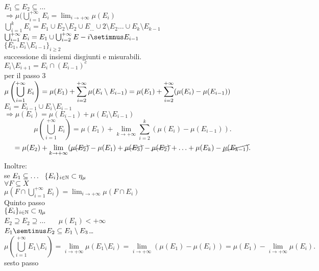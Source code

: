 \documentclass[12px]{article}
\begin{document}
\begin{dimo}
			  $E_1\subseteq E_2\subseteq\ldots$\\
			  $ \Rightarrow \mu ( \bigcup^{+\infty}_{i=1}E_i = \lim_{i \rightarrow +\infty} \mu(E_i)$\\
			  $ \bigcup^{k}_{i=1}E_i = E_1\cup E_2\setminus E_2\cup E_\ldots\cup2\setminus E_2\ldots\cup E_k\setminus E_{k-1}$\\
			  $ \bigcup^{+\infty}_{i=1}E_i = E_1\cup \bigcup^{+\infty}_{i=2}E-i\setimnus E_{i-1}$\\
			  $\{E_1,E_i\setminus E_{i-1}\}_{i\geq 2}$\\
			  successione di insiemi disgiunti e misurabili.\\
			  $E_i\setminus E_{i+1} = E_i\cap (E_{i-1})^c$\\
			  per il passo $3$ \ \ $\displaystyle \mu \left( \bigcup^{+\infty}_{i=1}E_i \right) = \mu(E_1) + \sum^{+\infty}_{i = 2}\mu (E_i\setminus E_{i-1})\\
			  = \mu(E_1) + \sum^{+\infty}_{i=2}(\mu(E_i) - \mu (E_{i-1}))$\\
			  $E_i = E_{i-1}\cup E_i\setminus E_{i-1}$\\
			  $ \Rightarrow \mu (E_i) = \mu (E_{i-1}) + \mu (E_i\setminus E_{i-1})$
			  \[
				  \mu( \bigcup^{+\infty}_{i=1}E_i) = \mu(E_1) + \lim_{k \rightarrow + \infty} \sum^{k}_{i=2}(\mu(E_i) - \mu (E_{i-1})) 
			  .\] 
			  \[
			   = \mu(E_2) + \lim_{k \rightarrow +\infty} ( \cancel{\mu(E_2)} - \mu (E_1) + \cancel{\mu (E_3)} - \cancel{\mu (E_2)} + \ldots + \mu (E_k) - \cancel{\mu(E_{k-1})}
	   			  .\] 
			  Inoltre:\\
			  se $E_1\subseteq\ldots \ \ \{E_i\}_{i\in\N}\subset\eta_\mu$ \\
			  $\forall F\subseteq X$\\
			  $\mu \left(F\cap \bigcup^{+\infty}_{i = 1}E_i \right) = \lim_{i \rightarrow +\infty} \mu(F\cap E_i)$\\
			  Quinto passo\\
			  $\{E_i\}_{i\in\mathbb{N}}\subset \eta_\mu$\\
			   $E_2\supseteq E_2\supseteq \ldots$ \ \ \ $\mu(E_1) < +\infty$\\
			   $E_1\semtinus E_2\subseteq E_1\setminus E_3$\subseteq\ldots\\
			   \[
				   \mu \left( \bigcup^{+\infty}_{i = 1} E_1 \setminus E_{i} \right) = \lim_{i \rightarrow +\infty}\mu(E_1\setminus E_i)  = \lim_{i \rightarrow +\infty} (\mu(E_1) - \mu (E_i)) = \mu(E_1) - \lim_{i \rightarrow + \infty} \mu (E_i)
			   .\] 
			   sesto passo\\

\end{dimo}
\end{document}
